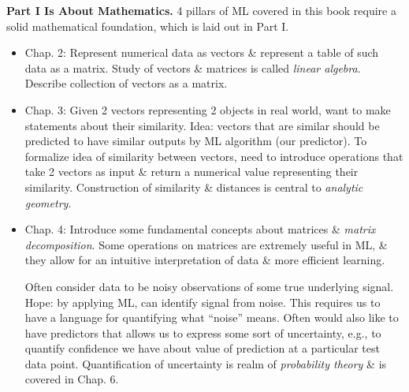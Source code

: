 \documentclass{article}
\begin{document}
\begin{itemize}
\begin{itemize}
		{\bf Part I Is About Mathematics.} 4 pillars of ML covered in this book require a solid mathematical foundation, which is laid out in Part I.
		\begin{itemize}
			\item Chap. 2: Represent numerical data as vectors \& represent a table of such data as a matrix. Study of vectors \& matrices is called {\it linear algebra}. Describe collection of vectors as a matrix.
			\item Chap. 3: Given 2 vectors representing 2 objects in real world, want to make statements about their similarity. Idea: vectors that are similar should be predicted to have similar outputs by ML algorithm (our predictor). To formalize idea of similarity between vectors, need to introduce operations that take 2 vectors as input \& return a numerical value representing their similarity. Construction of similarity \& distances is central to {\it analytic geometry}.
			\item Chap. 4: Introduce some fundamental concepts about matrices \& {\it matrix decomposition}. Some operations on matrices are extremely useful in ML, \& they allow for an intuitive interpretation of data \& more efficient learning.
			
			Often consider data to be noisy observations of some true underlying signal. Hope: by applying ML, can identify signal from noise. This requires us to have a language for quantifying what ``noise'' means. Often would also like to have predictors that allows us to express some sort of uncertainty, e.g., to quantify confidence we have about value of prediction at a particular test data point. Quantification of uncertainty is realm of {\it probability theory} \& is covered in Chap. 6.
			

\end{itemize}
\end{itemize}
\end{itemize}
\end{document}
